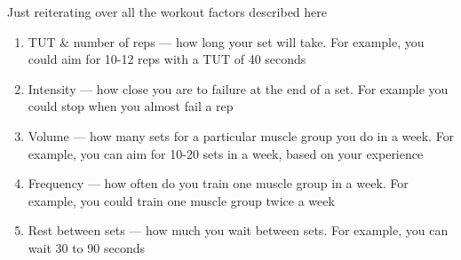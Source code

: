 \documentclass[openany, 12pt]{book}
\begin{document}
        Just reiterating over all the workout factors described here
        \begin{enumerate}
		\item TUT \& number of reps --- how long your set will take. For example, you could aim for 10-12 reps with a TUT of 40 seconds
		\item Intensity --- how close you are to failure at the end of a set. For example you could stop when you almost fail a rep
		\item Volume --- how many sets for a particular muscle group you do in a week. For example, you can aim for 10-20 sets in a week, based on your experience
		\item Frequency --- how often do you train one muscle group in a week. For example, you could train one muscle group twice a week
		\item Rest between sets --- how much you wait between sets. For example, you can wait 30 to 90 seconds
        \end{enumerate}
\end{document}
